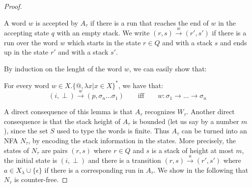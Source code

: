 \begin{proof}
\begin{itemize}
\begin{center}
\end{center}
\end{itemize}
A word $w$ is accepted by $A_\tau$ if there is a run that reaches the end of $w$ in the accepting state $q$ with an empty stack. We write $(r, s)\xrightarrow{w} (r', s')$ if there is a run over the word $w$ which starts in the state $r\in Q$ and with a stack $s$ and ends up in the state $r'$ and with a stack $s'$.


By induction on the lenght of the word $w$, we can easily show that:
\begin{lemma}
For every word $w\in X.\{\text{@},\lambda x | x\in X \}^*$, we have that:
 $$(i, \perp)\xrightarrow{w} (p, \sigma_n\dots\sigma_1) \qquad\text{iff} \qquad 
w:\sigma_1\rightarrow\dots\rightarrow\sigma_n$$ 
\end{lemma}

A direct consequence of this lemma is that $A_\tau$ recognizes $W_\tau$. Another direct consequence is that the stack height of $A_\tau$ is bounded (let us say by a number $m$), since the set $S$ used to type the words is finite. Thus $A_\tau$ can be turned into an NFA $N_\tau$, by encoding the stack information in the states. More precisely, the states of $N_\tau$ are pairs $(r,s)$ where $r\in Q$ and $s$ is a stack of height at most $m$, the initial state is $(i,\perp)$ and there is a transition $(r,s)\xrightarrow{a}(r',s')$ where $a\in X_\lambda\cup\{\epsilon\}$ if there is a corresponding run in $A_\tau$. We show in the following that $N_\tau$ is counter-free. 


\end{proof}
